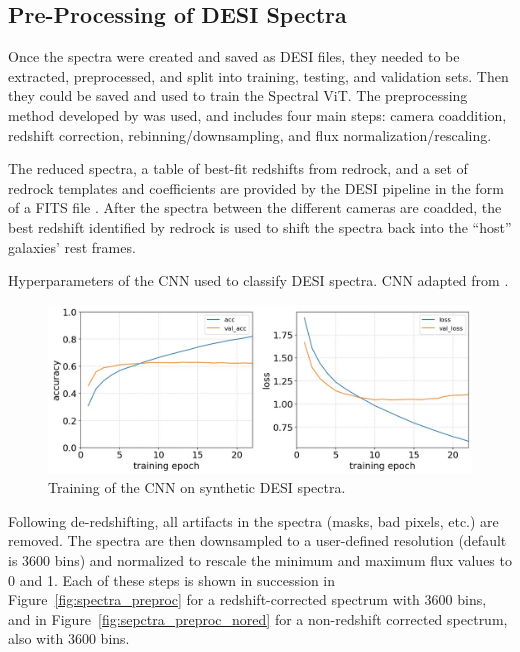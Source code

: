 \subsection{Pre-Processing of DESI Spectra}
\label{ssec:preprocess}
Once the spectra were created and saved as DESI files, they needed to be 
extracted, preprocessed, and split into training, testing, and validation sets. Then they could be saved and used to train the Spectral ViT.
The preprocessing method developed by \textcite{wasserman2021, Sepeku2022} was used, and includes four main steps: camera coaddition, redshift correction, rebinning/downsampling, and flux normalization/rescaling. 

The reduced spectra, a table of best-fit redshifts from redrock, and a set of redrock templates and 
coefficients are provided by the DESI pipeline in the form of a FITS file \parencite{Pence2010, Guy2023}.
After the spectra between the different cameras are coadded, the best redshift identified by redrock is used to shift the spectra back into the 
``host'' galaxies' rest frames. 
\begin{table}[t!]
    \small
    \centering
    \sffamily
    
    \caption{Hyperparameters of the CNN used to classify DESI spectra. CNN adapted 
    from \textcite{Sepeku2022}.}
    \label{tab:cnn_hyperparameters}
\end{table}
\begin{figure}[b!]
    \centering
    \includegraphics[width=.85\linewidth]{figures/cnn/cnn_training_history.jpg}
    \caption[CNN Training]{Training of the CNN on synthetic DESI spectra.}
    \label{fig:cnn_training}
\end{figure}
Following de-redshifting, all artifacts in the spectra (masks, bad pixels, etc.) are removed. The spectra are then downsampled to a user-defined resolution (default is 3600 bins) and normalized to rescale the minimum and maximum flux values to 0 and 1. 
Each of these steps is shown in succession in Figure~\ref{fig:spectra_preproc} for a 
redshift-corrected spectrum with 3600 bins, and in Figure~\ref{fig:sepctra_preproc_nored} for a non-redshift corrected spectrum, also with 3600 bins. 

